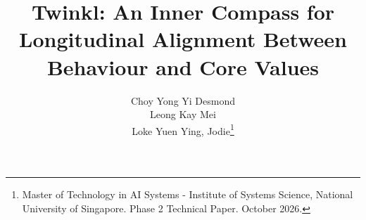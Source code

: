 \title{Twinkl: An Inner Compass for Longitudinal Alignment Between Behaviour and Core Values}
\author{Choy Yong Yi Desmond\\Leong Kay Mei\\Loke Yuen Ying, Jodie\thanks{Master of Technology in AI Systems - Institute of Systems Science, National University of Singapore. Phase 2 Technical Paper. October 2026.}}
\date{}
\maketitle
